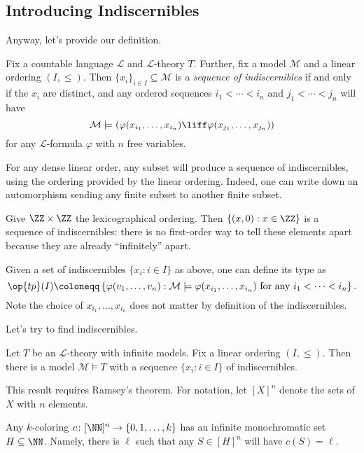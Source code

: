 \documentclass[../notes.tex]{subfiles}
\begin{document}
\subsection{Introducing Indiscernibles}
Anyway, let's provide our definition.
\begin{definition}
	Fix a countable language $\mathcal L$ and $\mathcal L$-theory $T$. Further, fix a model $\mathcal M$ and a linear ordering $(I,\le)$. Then $\{x_i\}_{i\in I}\subseteq\mathcal M$ is a \textit{sequence of indiscernibles} if and only if the $x_i$ are distinct, and any ordered sequences $i_1<\cdots<i_n$ and $j_1<\cdots<j_n$ will have
	\[\mathcal M\models\left(\varphi(x_{i_1},\ldots,x_{i_n})\liff\varphi(x_{j_1},\ldots,x_{j_n})\right)\]
	for any $\mathcal L$-formula $\varphi$ with $n$ free variables.
\end{definition}
\begin{example}
	For any dense linear order, any subset will produce a sequence of indiscernibles, using the ordering provided by the linear ordering. Indeed, one can write down an automorphism sending any finite subset to another finite subset.
\end{example}
\begin{example}
	Give $\ZZ\times\ZZ$ the lexicographical ordering. Then $\{(x,0):x\in\ZZ\}$ is a sequence of indiscernibles: there is no first-order way to tell these elements apart because they are already ``infinitely'' apart.
\end{example}
\begin{remark}
	Given a set of indiscernibles $\{x_i:i\in I\}$ as above, one can define its type as
	\[\op{tp}(I)\coloneqq\left\{\varphi(v_1,\ldots,v_n):\mathcal M\models\varphi(x_{i_1},\ldots,x_{i_n})\text{ for any }i_1<\cdots<i_n\right\}.\]
	Note the choice of $x_{i_1},\ldots,x_{i_n}$ does not matter by definition of the indiscernibles.
\end{remark}
Let's try to find indiscernibles.
\begin{theorem} \label{thm:indisc-exist}
	Let $T$ be an $\mathcal L$-theory with infinite models. Fix a linear ordering $(I,\le)$. Then there is a model $\mathcal M\models T$ with a sequence $\{x_i:i\in I\}$ of indiscernibles.
\end{theorem}
This result requires Ramsey's theorem. For notation, let $[X]^n$ denote the sets of $X$ with $n$ elements.
\begin{theorem}[Ramsey] \label{thm:ramsey}
	Any $k$-coloring $c\colon[\NN]^n\to\{0,1,\ldots,k\}$ has an infinite monochromatic set $H\subseteq\NN$. Namely, there is $\ell$ such that any $S\in[H]^n$ will have $c(S)=\ell$.
\end{theorem}
\end{document}

